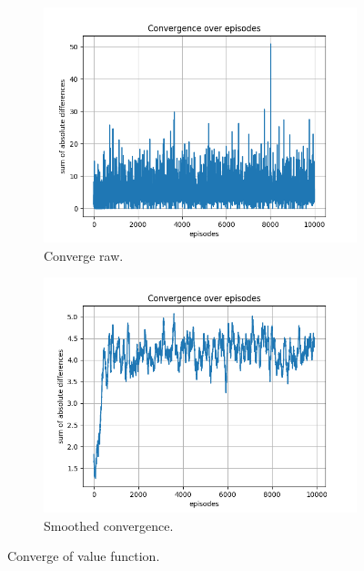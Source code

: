 \documentclass{assignment}
\begin{document}
\begin{figure}[H]
    \begin{subfigure}{0.5\textwidth}
        \includegraphics[width=\textwidth]{figures/convergence_q/gamma_sweep/convergence_Q_alpha_0.1_gamma_0.5_epislon_0.2.png}
    \caption{Converge raw.}
    \end{subfigure}\hfill
    \begin{subfigure}{0.5\textwidth}
        \includegraphics[width=\textwidth]{figures/convergence_q/gamma_sweep/convergence_Q_smoothed_alpha_0.1_gamma_0.5_epislon_0.2.png}
    \caption{Smoothed convergence.}
    \end{subfigure}
    \caption{Converge of value function.}
    \label{fig:gamma_0.5_q_learning_convergence}
\end{figure}
\end{document}
